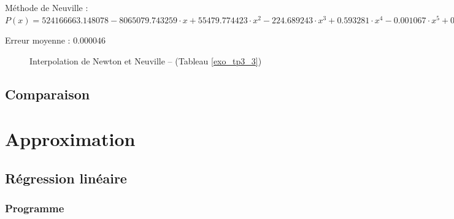 \documentclass{report}
\begin{document}
      Méthode de Neuville : $P(x)= 524166663.148078-8065079.743259 \cdot x + 55479.774423 \cdot x^{2} - 224.689243 \cdot x^{3}  + 0.593281 \cdot x^{4} - 0.001067 \cdot x^{5}  + 0.000001 \cdot x^{6} - 0.000000 \cdot x^{7}  + 0.000000 \cdot x^{8} - 0.000000 \cdot x^{9}  + 0.000000 \cdot x^{10} $
      
      Erreur moyenne : $0.000046$
      \begin{figure}[h]
	\centering
	\caption{Interpolation de Newton et Neuville -- (Tableau \ref{exo_tp3_3})}
      \end{figure}
      \renewcommand{\arraystretch}{2}
      \renewcommand{\arraystretch}{1}
    \newpage
    \section{Comparaison}
  \chapter{Approximation}
    \section{Régression linéaire}
      \subsection{Programme}
	
    \newpage
\end{document}
